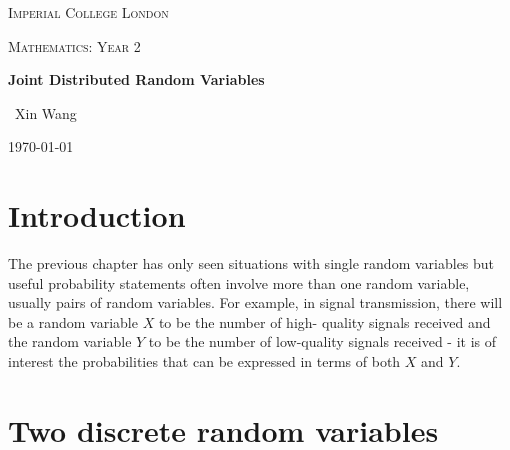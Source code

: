 \documentclass[10pt,a4paper]{article}
\begin{document}
\begin{titlepage}
	\centering
	{\scshape\LARGE Imperial College London \par}
	\vspace{1cm}
	{\scshape\Large Mathematics: Year 2\par}
	\vspace{1.5cm}
	{\huge\bfseries Joint Distributed Random Variables \par}
	\vspace{2cm}
	{\Large\ Xin Wang }
	\vfill
	{\large \today\par}
\end{titlepage}

\begin{abstract}
Previous chapters have covered concepts to group data together in a coherent format such as
cumulative distribution function and probability density function. This chapter combines probability
and concepts like CDF and PDF.

Given random variables $X$ and $Y$ that are defined on a probability space, the joint probability
distribution for $X$ and $Y$ is a probability distribution that gives the probability in that each
of the random variables $X$ and $Y$ falls in any particular range or discrete set of specified values. 
\end{abstract}

\tableofcontents
\pagebreak

\section{Introduction}

The previous chapter has only seen situations with single random variables but useful probability
statements often involve more than one random variable, usually pairs of random variables. For
example, in signal transmission, there will be a random variable $X$ to be the number of high-
quality signals received and the random variable $Y$ to be the number of low-quality signals
received - it is of interest the probabilities that can be expressed in terms of both $X$ and $Y$.

\section{Two discrete random variables}
\end{document}
